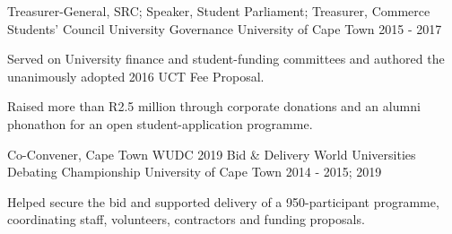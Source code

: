 \begin{cventries}
  \cventry
  {Treasurer-General, SRC; Speaker, Student Parliament; Treasurer,
  Commerce Students' Council}
  {University Governance}
  {University of Cape Town}
  {2015 - 2017}
  {
    \begin{cvitems}
    \item {Served on University finance and student-funding
      committees and authored the unanimously adopted 2016 UCT Fee Proposal.}
    \item {Raised more than R2.5 million through corporate donations
      and an alumni phonathon for an open student-application programme.}
    \end{cvitems}
  }

  \cventry
  {Co-Convener, Cape Town WUDC 2019 Bid \& Delivery}
  {World Universities Debating Championship}
  {University of Cape Town}
  {2014 - 2015; 2019}
  {
    \begin{cvitems}
    \item {Helped secure the bid and supported delivery of a
        950-participant programme, coordinating staff, volunteers,
      contractors and funding proposals.}
    \end{cvitems}
  }
\end{cventries}
